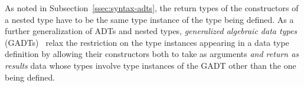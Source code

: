 \documentclass[9pt]{entcs} \usepackage{entcsmacro}
\begin{document}

As noted in Subsection~\ref{ssec:syntax-adts},
the return types of the constructors of a nested
type have to be the same type instance of the type being defined.
As a further generalization of ADTs and nested types,
\emph{generalized algebraic data types} (GADTs)~\cite{ch03,xcc03,sp04}
relax the restriction on the type instances appearing in a data
type definition by allowing their constructors both to take as
arguments \emph{and return as results} data whose types involve type
instances of the GADT other than the one being defined.
\end{document}
